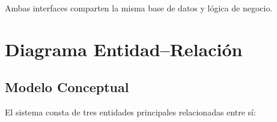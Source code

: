 \documentclass[12pt, a4paper]{article}
\begin{document}
Ambas interfaces comparten la misma base de datos y lógica de negocio.

\newpage
\section{Diagrama Entidad–Relación}

\subsection{Modelo Conceptual}

El sistema consta de tres entidades principales relacionadas entre sí:
\end{document}
